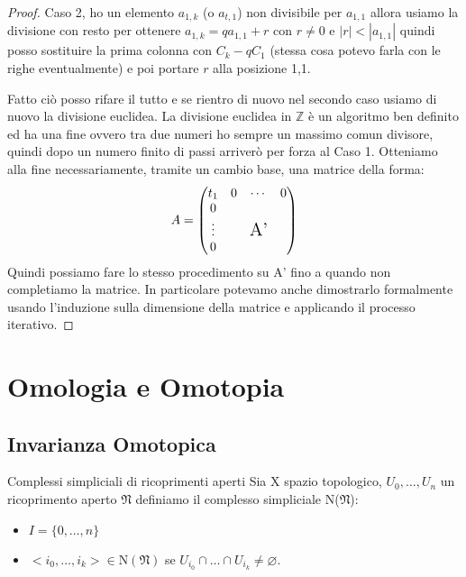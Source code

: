 \documentclass[11pt, a4paper, twoside]{article}
\begin{document}
\begin{proof}
	Caso 2, ho un elemento $a_{1,k}$ (o $a_{t,1}$) non divisibile per $a_{1,1}$ allora usiamo la divisione con resto per ottenere $a_{1,k}=qa_{1,1}+r$ con $r\neq 0$ e $|r|<|a_{1,1}|$ quindi posso sostituire la prima colonna con $C_k -qC_1$ (stessa cosa potevo farla con le righe eventualmente) e poi portare $r$ alla posizione 1,1.
	 
	Fatto ciò posso rifare il tutto e se rientro di nuovo nel secondo caso usiamo di nuovo la divisione euclidea. La divisione euclidea in $\mathbb{Z}$ è un algoritmo ben definito ed ha una fine ovvero tra due numeri ho sempre un massimo comun divisore, quindi dopo un numero finito di passi arriverò per forza al Caso 1. 
	Otteniamo alla fine necessariamente, tramite un cambio base, una matrice della forma:
	\[
		A=\begin{pmatrix}t_{1}&0&\cdots&0\\ 0& & &\\ \vdots& &\Large\text{A'}&\\0& & & \end{pmatrix}
	\]
	Quindi possiamo fare lo stesso procedimento su A' fino a quando non completiamo la matrice. In particolare potevamo anche dimostrarlo formalmente usando l'induzione sulla dimensione della matrice e applicando il processo iterativo. 
\end{proof}

\newpage

\section{Omologia e Omotopia}
\subsection{Invarianza Omotopica}
\begin{defn}{Complessi simpliciali di ricoprimenti aperti}{}
	Sia X spazio topologico, $U_0,\dots,U_n$ un ricoprimento aperto $\mathfrak{N}$ definiamo il complesso simpliciale N($\mathfrak{N}$):
	\begin{itemize}
		\item $I=\{0,\dots,n\}$
		\item $<i_0,\dots,i_k>\in \text{N}(\mathfrak{N})$ se $U_{i_0}\cap\dots\cap U_{i_k}\neq \varnothing$.
	\end{itemize}
\end{defn}
\end{document}
